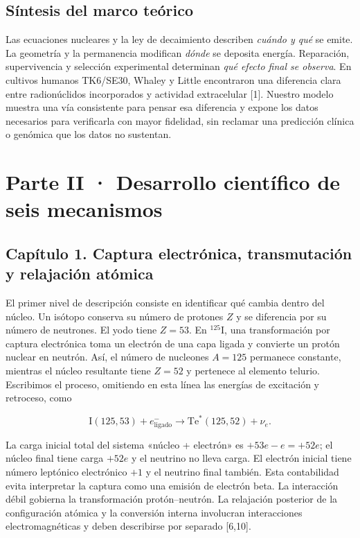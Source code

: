 \documentclass[11pt,a4paper,oneside]{article}
\begin{document}
\subsection{Síntesis del marco teórico}\label{suxedntesis-del-marco-teuxf3rico}

Las ecuaciones nucleares y la ley de decaimiento describen \emph{cuándo y qué} se emite. La geometría y la permanencia modifican \emph{dónde} se deposita energía. Reparación, supervivencia y selección experimental determinan \emph{qué efecto final se observa}. En cultivos humanos TK6/SE30, Whaley y Little encontraron una diferencia clara entre radionúclidos incorporados y actividad extracelular {[}1{]}. Nuestro modelo muestra una vía consistente para pensar esa diferencia y expone los datos necesarios para verificarla con mayor fidelidad, sin reclamar una predicción clínica o genómica que los datos no sustentan.

\section{Parte II · Desarrollo científico de seis mecanismos}\label{parte-ii-desarrollo-cientuxedfico-de-seis-mecanismos}

\subsection{Capítulo 1. Captura electrónica, transmutación y relajación atómica}\label{capuxedtulo-1.-captura-electruxf3nica-transmutaciuxf3n-y-relajaciuxf3n-atuxf3mica}

El primer nivel de descripción consiste en identificar qué cambia dentro del núcleo. Un isótopo conserva su número de protones \(Z\) y se diferencia por su número de neutrones. El yodo tiene \(Z=53\). En \(^{125}\)I, una transformación por captura electrónica toma un electrón de una capa ligada y convierte un protón nuclear en neutrón. Así, el número de nucleones \(A=125\) permanece constante, mientras el núcleo resultante tiene \(Z=52\) y pertenece al elemento telurio. Escribimos el proceso, omitiendo en esta línea las energías de excitación y retroceso, como

\[\mathrm I(125,53)+e^-_{\mathrm{ligado}}\longrightarrow \mathrm{Te}^{*}(125,52)+\nu_e.\]

La carga inicial total del sistema «núcleo + electrón» es \(+53e-e=+52e\); el núcleo final tiene carga \(+52e\) y el neutrino no lleva carga. El electrón inicial tiene número leptónico electrónico \(+1\) y el neutrino final también. Esta contabilidad evita interpretar la captura como una emisión de electrón beta. La interacción débil gobierna la transformación protón--neutrón. La relajación posterior de la configuración atómica y la conversión interna involucran interacciones electromagnéticas y deben describirse por separado {[}6,10{]}.
\end{document}
